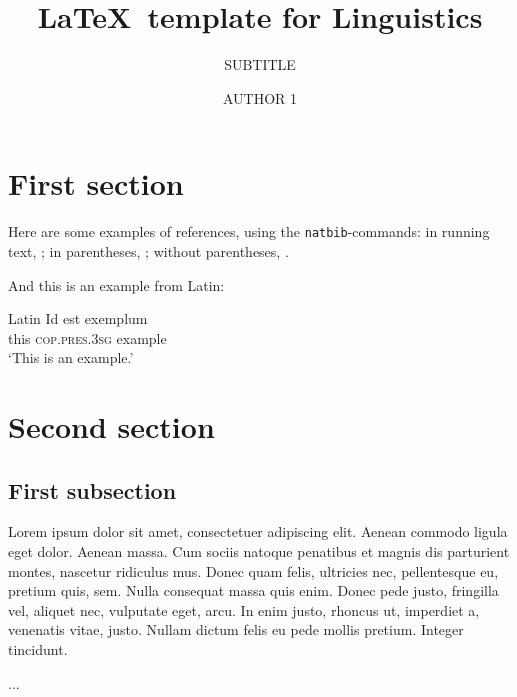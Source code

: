 \documentclass[english]{article}
\begin{document}

   \author*[1]{AUTHOR 1}
  \title{\LaTeX\ template for Linguistics}
  \subtitle{SUBTITLE}
  \aop

\maketitle  

\section{First section} 

Here are some examples of references, using the \verb+natbib+-commands:
in running text, \citet[123]{Dowty:1979};
in parentheses, \citep{Grimm:2012, R};
without parentheses, \citealt{oldlme4, lme4}.

And this is an example from Latin:

\begin{exe}
  \ex\label{example}
  Latin
  \gll Id est exemplum\\
       this \textsc{cop.pres.3sg} example\\
       `This is an example.'\\
       \citep[112]{Partee:1995}
\end{exe}

\section{Second section} 

\subsection{First subsection} 

Lorem ipsum dolor sit amet, consectetuer adipiscing elit. Aenean
commodo ligula eget dolor. Aenean massa. Cum sociis natoque penatibus
et magnis dis parturient montes, nascetur ridiculus mus. Donec quam
felis, ultricies nec, pellentesque eu, pretium quis, sem. Nulla
consequat massa quis enim. Donec pede justo, fringilla vel, aliquet
nec, vulputate eget, arcu. In enim justo, rhoncus ut, imperdiet a,
venenatis vitae, justo. Nullam dictum felis eu pede mollis
pretium. Integer tincidunt.

\begin{acknowledgement}
  ...
\end{acknowledgement}

\printbibliography
\end{document}
